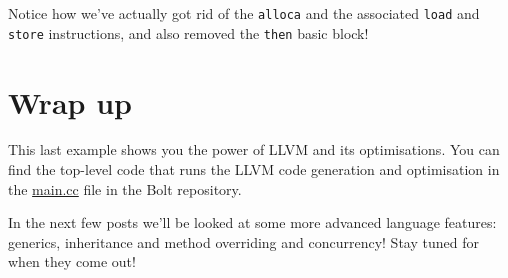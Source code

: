 Notice how we've actually got rid of the \texttt{alloca} and the
associated \texttt{load} and \texttt{store} instructions, and also
removed the \texttt{then} basic block!

\hypertarget{wrap-up}{%
\section{\texorpdfstring{\protect\hyperlink{wrap-up}{}Wrap
up}{Wrap up}}\label{wrap-up}}

This last example shows you the power of LLVM and its optimisations. You
can find the top-level code that runs the LLVM code generation and
optimisation in the
\href{https://github.com/mukul-rathi/bolt/blob/master/src/llvm-backend/main.cc}{main.cc}
file in the Bolt repository.

In the next few posts we'll be looked at some more advanced language
features: generics, inheritance and method overriding and concurrency!
Stay tuned for when they come out!

